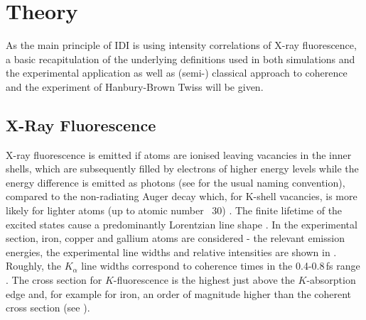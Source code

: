 \chapter{Theory}
\label{chap:theory}
As the main principle of IDI is using intensity correlations of X-ray fluorescence, a basic recapitulation of the underlying definitions used in both simulations and the experimental application as well as (semi-) classical approach to coherence and the experiment of Hanbury-Brown Twiss will be given.


\section{X-Ray Fluorescence}
X-ray fluorescence is emitted if atoms are ionised leaving vacancies in the inner shells, which are subsequently filled by electrons of higher energy levels while the energy difference is emitted as photons  (see  for the usual naming convention), compared to the non-radiating Auger decay which, for K-shell vacancies, is more likely for lighter atoms (up to atomic number ~30) \cite{santra2009}.  The finite lifetime of the excited states cause a predominantly Lorentzian line shape \cite{attwood1999,van2001}. In the experimental section, iron, copper and gallium atoms are considered - the relevant emission energies, the experimental line widths and relative intensities are shown in .   Roughly, the $K_\alpha$ line widths correspond to coherence times in the 0.4-0.8\,fs range \cite{krause1979}. The cross section for $K$-fluorescence is the highest just above the $K$-absorption edge and, for example for iron, an order of magnitude higher than the coherent cross section (see ).

